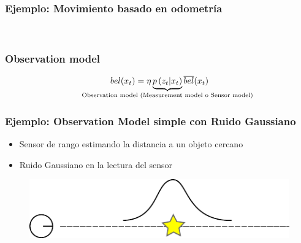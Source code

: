\begin{frame}
  \frametitle{Ejemplo: Movimiento basado en odometría}
    
    \begin{figure}[!h]
        \centering
        \\
    \end{figure}
    
    
\end{frame}

\begin{frame}
  \frametitle{Observation model}
    \begin{equation*}
        bel(\state_{t}) = \eta \underbrace{p\left(\observation_{t} |\state_{t} \right)}_{\text{\makebox[0pt]{Observation model (Measurement model o Sensor model)}}} \overline{bel}(\state_{t})
    \end{equation*}
\end{frame}

\begin{frame}
  \frametitle{Ejemplo: Observation Model simple con Ruido Gaussiano}
    
    \begin{itemize}
        \item Sensor de rango estimando la distancia a un objeto cercano
        \item Ruido Gaussiano en la lectura del sensor
    \end{itemize}
    
       \begin{figure}[!h]
           \includegraphics[width=0.6\columnwidth]{./images/simple_observation_model.pdf}
    \end{figure}

\end{frame}
